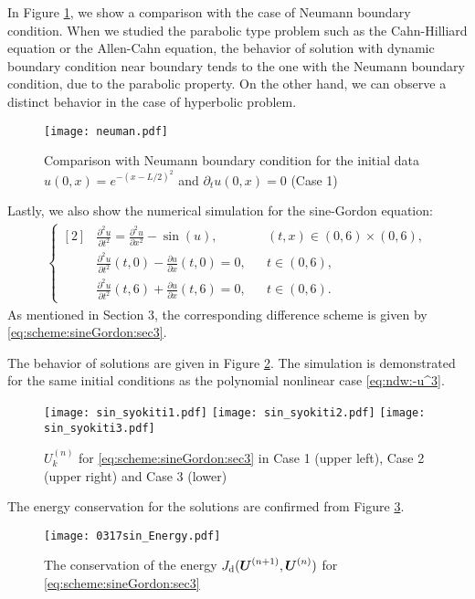 \documentclass[dvipdfmx-if-dvi,autodetect-engine,ja=standard]{amsart}
\numberwithin{equation}{section} %
\def\vect#1{\mbox{\boldmath $#1$}} %
\begin{document}
In Figure \ref{fig:neuman},
we show a comparison with
the case of Neumann boundary condition. 
When we studied the parabolic type problem such as the Cahn-Hilliard equation or 
the Allen-Cahn equation, the behavior of solution with dynamic boundary condition near boundary tends to the 
one with the Neumann boundary condition, due to the parabolic property. 
On the other hand, we can observe a distinct behavior in the case of hyperbolic 
problem. 
\begin{figure}[H]
\begin{center}
\texttt{[image: neuman.pdf]}
\caption{Comparison with Neumann boundary condition for
the initial data
$u(0,x) = e^{-(x-L/2)^2}$
and $\partial_t u(0,x) = 0$ (Case 1)}
    \label{fig:neuman} 
\end{center}
\end{figure}


Lastly, we also show the numerical simulation for the sine-Gordon equation: 
\begin{align}\label{eq:ndw:sin(u)}
    \left\{ \begin{aligned}[2]
    &\frac{\partial^2 u}{\partial t^2} = \frac{\partial^2 u}{\partial x^2} - \sin(u),
    &&(t,x) \in (0,6)\times (0,6),\\
    &\frac{\partial^2 u}{\partial t^2}(t,0)
    - \frac{\partial u}{\partial x}(t,0) = 0,
    &&t\in (0,6),\\
    &\frac{\partial^2 u}{\partial t^2}(t,6)
    +\frac{\partial u}{\partial x}(t,6) = 0,
    &&t\in (0,6).
    \end{aligned}\right.
\end{align}
As mentioned in Section 3, the corresponding difference scheme is given by
\eqref{eq:scheme:sineGordon:sec3}.


The behavior of solutions are given in Figure \ref{fig:s1}. 
The simulation is demonstrated for the same initial conditions as 
the polynomial nonlinear case \eqref{eq:ndw:-u^3}. 
\begin{figure}[H]
\begin{center}
{\texttt{[image: sin\_syokiti1.pdf]} 
\texttt{[image: sin\_syokiti2.pdf]}
\texttt{[image: sin\_syokiti3.pdf]}}
\caption{$U_k^{(n)}$ for \eqref{eq:scheme:sineGordon:sec3} in Case 1 (upper left), Case 2 (upper right) and Case 3 (lower)}
    \label{fig:s1} 
\end{center}
\end{figure}
The energy conservation for the solutions are confirmed from Figure \ref{fig:s2}.  
\begin{figure}[H]
\begin{center}
\texttt{[image: 0317sin\_Energy.pdf]} 
\caption{The conservation of the energy $J_{\mathrm{d}}(\vect{U}^{(n+1)}, \vect{U}^{(n)})$ for \eqref{eq:scheme:sineGordon:sec3}}
    \label{fig:s2} 
\end{center}
\end{figure}
\end{document}
